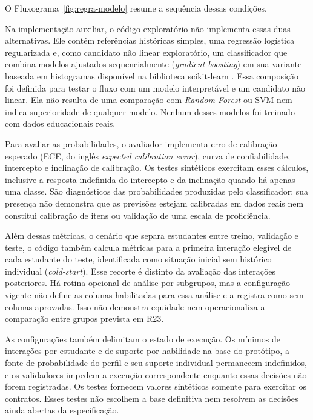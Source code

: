 O Fluxograma~\ref{fig:regra-modelo} resume a sequência dessas condições.



Na implementação auxiliar, o código exploratório não implementa essas duas alternativas. Ele contém referências históricas simples, uma regressão logística regularizada \cite{James2021} e, como candidato não linear exploratório, um classificador que combina modelos ajustados sequencialmente (\textit{gradient boosting}) \cite{Friedman2001} em sua variante baseada em histogramas disponível na biblioteca scikit-learn \cite{Pedregosa2011}. Essa composição foi definida para testar o fluxo com um modelo interpretável e um candidato não linear. Ela não resulta de uma comparação com \textit{Random Forest} ou SVM nem indica superioridade de qualquer modelo. Nenhum desses modelos foi treinado com dados educacionais reais.

Para avaliar as probabilidades, o avaliador implementa erro de calibração esperado (ECE, do inglês \textit{expected calibration error}), curva de confiabilidade, intercepto e inclinação de calibração. Os testes sintéticos exercitam esses cálculos, inclusive a resposta indefinida do intercepto e da inclinação quando há apenas uma classe. São diagnósticos das probabilidades produzidas pelo classificador: sua presença não demonstra que as previsões estejam calibradas em dados reais nem constitui calibração de itens ou validação de uma escala de proficiência.

Além dessas métricas, o cenário que separa estudantes entre treino, validação e teste, o código também calcula métricas para a primeira interação elegível de cada estudante do teste, identificada como situação inicial sem histórico individual (\textit{cold-start}). Esse recorte é distinto da avaliação das interações posteriores. Há rotina opcional de análise por subgrupos, mas a configuração vigente não define as colunas habilitadas para essa análise e a registra como sem colunas aprovadas. Isso não demonstra equidade nem operacionaliza a comparação entre grupos prevista em R23.

As configurações também delimitam o estado de execução. Os mínimos de interações por estudante e de suporte por habilidade na base do protótipo, a fonte de probabilidade do perfil e seu suporte individual permanecem indefinidos, e os validadores impedem a execução correspondente enquanto essas decisões não forem registradas. Os testes fornecem valores sintéticos somente para exercitar os contratos. Esses testes não escolhem a base definitiva nem resolvem as decisões ainda abertas da especificação.

